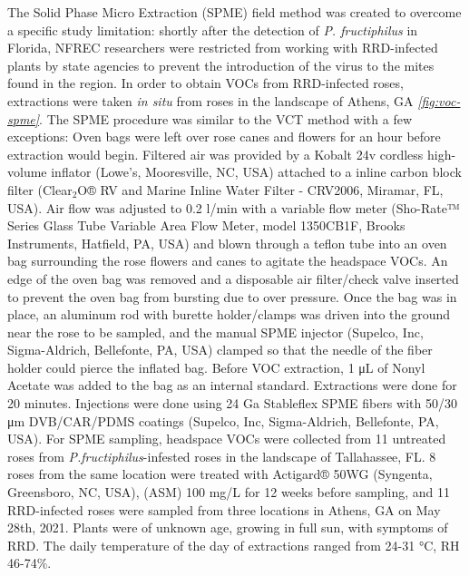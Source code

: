 \documentclass[12pt,final,CPage]{ufthesis}
\renewcommand{\hypertarget}[2]{\leavevmode\oldhypertarget{#1}{#2}}
\begin{document}
{  \hypertarget{mm-spme}{%
  \subsubsection{Solid phase micro extraction (SPME) methodology}\label{mm-spme}}

  The Solid Phase Micro Extraction (SPME) field method was created to overcome a specific study limitation: shortly after the detection of \emph{P. fructiphilus} in Florida, NFREC researchers were restricted from working with RRD-infected plants by state agencies to prevent the introduction of the virus to the mites found in the region. In order to obtain VOCs from RRD-infected roses, extractions were taken \emph{in situ} from roses in the landscape of Athens, GA \emph{\ref{fig:voc-spme}}. The SPME procedure was similar to the VCT method with a few exceptions: Oven bags were left over rose canes and flowers for an hour before extraction would begin. Filtered air was provided by a Kobalt 24v cordless high-volume inflator (Lowe's, Mooresville, NC, USA) attached to a inline carbon block filter (Clear\(_2\)O® RV and Marine Inline Water Filter - CRV2006, Miramar, FL, USA). Air flow was adjusted to 0.2 \si{\litre}/min with a variable flow meter (Sho-Rate™ Series Glass Tube Variable Area Flow Meter, model 1350CB1F, Brooks Instruments, Hatfield, PA, USA) and blown through a teflon tube into an oven bag surrounding the rose flowers and canes to agitate the headspace VOCs. An edge of the oven bag was removed and a disposable air filter/check valve inserted to prevent the oven bag from bursting due to over pressure. Once the bag was in place, an aluminum rod with burette holder/clamps was driven into the ground near the rose to be sampled, and the manual SPME injector (Supelco, Inc, Sigma-Aldrich, Bellefonte, PA, USA) clamped so that the needle of the fiber holder could pierce the inflated bag. Before VOC extraction, 1 \si{\micro\liter} of Nonyl Acetate was added to the bag as an internal standard. Extractions were done for 20 minutes. Injections were done using 24 Ga Stableflex SPME fibers with 50/30 \si{\micro\meter} DVB/CAR/PDMS coatings (Supelco, Inc, Sigma-Aldrich, Bellefonte, PA, USA). For SPME sampling, headspace VOCs were collected from 11 untreated roses from \emph{P.fructiphilus}-infested roses in the landscape of Tallahassee, FL. 8 roses from the same location were treated with Actigard® 50WG (Syngenta, Greensboro, NC, USA), (ASM) 100 \si{\milli\gram}/\si{\liter} for 12 weeks before sampling, and 11 RRD-infected roses were sampled from three locations in Athens, GA on May 28th, 2021. Plants were of unknown age, growing in full sun, with symptoms of RRD. The daily temperature of the day of extractions ranged from 24-31 °C, RH 46-74\%.

}
\end{document}
